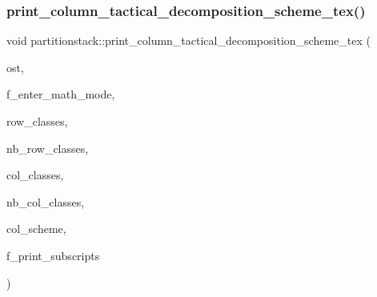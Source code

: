 \subsubsection{\texorpdfstring{print\+\_\+column\+\_\+tactical\+\_\+decomposition\+\_\+scheme\+\_\+tex()}{print\_column\_tactical\_decomposition\_scheme\_tex()}}
{\footnotesize\ttfamily void partitionstack\+::print\+\_\+column\+\_\+tactical\+\_\+decomposition\+\_\+scheme\+\_\+tex (\begin{DoxyParamCaption}\item[{ostream \&}]{ost,  }\item[{\mbox{\hyperlink{galois_8h_a09fddde158a3a20bd2dcadb609de11dc}{I\+NT}}}]{f\+\_\+enter\+\_\+math\+\_\+mode,  }\item[{\mbox{\hyperlink{galois_8h_a09fddde158a3a20bd2dcadb609de11dc}{I\+NT}} $\ast$}]{row\+\_\+classes,  }\item[{\mbox{\hyperlink{galois_8h_a09fddde158a3a20bd2dcadb609de11dc}{I\+NT}}}]{nb\+\_\+row\+\_\+classes,  }\item[{\mbox{\hyperlink{galois_8h_a09fddde158a3a20bd2dcadb609de11dc}{I\+NT}} $\ast$}]{col\+\_\+classes,  }\item[{\mbox{\hyperlink{galois_8h_a09fddde158a3a20bd2dcadb609de11dc}{I\+NT}}}]{nb\+\_\+col\+\_\+classes,  }\item[{\mbox{\hyperlink{galois_8h_a09fddde158a3a20bd2dcadb609de11dc}{I\+NT}} $\ast$}]{col\+\_\+scheme,  }\item[{\mbox{\hyperlink{galois_8h_a09fddde158a3a20bd2dcadb609de11dc}{I\+NT}}}]{f\+\_\+print\+\_\+subscripts }\end{DoxyParamCaption})}

\mbox{\label{classpartitionstack_a988c07dc47753333f43dfc393f86f3f7}} 
